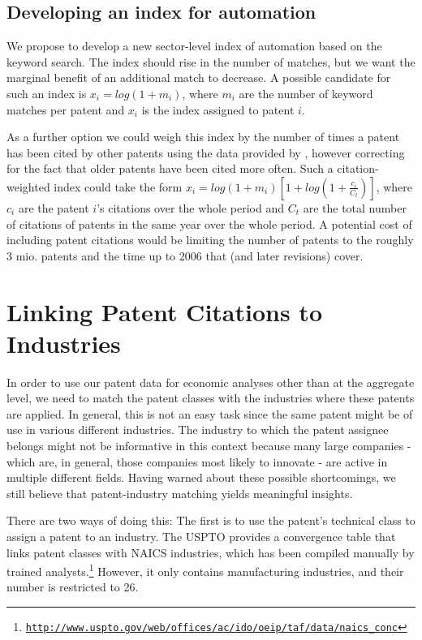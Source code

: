 \documentclass[11pt,a4paper]{article}
\begin{document}
\subsection{Developing an index for automation}
We propose to develop a new sector-level index of automation based on the keyword search. The index should rise in the number of matches, but we want the marginal benefit of an additional match to decrease.  A possible candidate for such an index is $x_i = log(1+m_i)$, where $m_i$ are the number of keyword matches per patent and $x_i$ is the index assigned to patent $i$. 

As a further option we could weigh this index by the number of times a patent has been cited by other patents using the data provided by \cite{HJT2001}, however correcting for the fact that older patents have been cited more often. Such a citation-weighted index could take the form $x_i = log(1+m_i) [1+log(1+\frac{c_i}{C_t})]$, where $c_i$ are the patent $i$'s citations over the whole period and $C_t$ are the total number of citations of patents in the same year over the whole period. A potential cost of including patent citations would be limiting the number of patents to the roughly 3 mio. patents and the time up to 2006 that \cite{HJT2001} (and later revisions) cover. 


\section{Linking Patent Citations to Industries}
In order to use our patent data for economic analyses other than at the aggregate level, we need to match the patent classes with the industries where these patents are applied. In general, this is not an easy task since the same patent might be of use in various different industries. The industry to which the patent assignee belongs might not be informative in this context because many large companies - which are, in general, those companies most likely to innovate - are active in multiple different fields. Having warned about these possible shortcomings, we still believe that patent-industry matching yields meaningful insights.%

There are two ways of doing this: The first is to use the patent's technical class to assign a patent to an industry. The USPTO provides a convergence table that links patent classes with NAICS industries, which has been compiled manually by trained analysts.\footnote{\href{http://www.uspto.gov/web/offices/ac/ido/oeip/taf/data/naics_conc/2013/read_me.txt}{\texttt{http://www.uspto.gov/web/offices/ac/ido/oeip/taf/data/naics\_conc}}} However, it only contains manufacturing industries, and their number is restricted to 26. 
\end{document}
